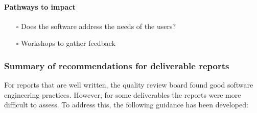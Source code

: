\paragraph{Pathways to impact}
\label{sec:orgc218a3a}
\begin{itemize}
\item[{$\square$}] Does the software address the needs of the users?
\item[{$\square$}] Workshops to gather feedback
\end{itemize}

\subsubsection{Summary of recommendations for deliverable reports}
\label{sec:summ-recomm-deliv}

For reports that are well written, the quality review board found good
software engineering practices. However, for some deliverables the
reports were more difficult to assess. To address this, the following
guidance has been developed:

